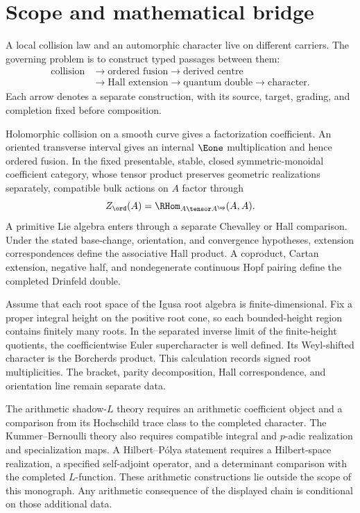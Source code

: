 \chapter*{Scope and mathematical bridge}

A local collision law and an automorphic character live on different
carriers. The governing problem is to construct typed passages between them:
\[
\begin{aligned}
\text{collision}
&\longrightarrow \text{ordered fusion}
 \longrightarrow \text{derived centre}\\
&\longrightarrow \text{Hall extension}
 \longrightarrow \text{quantum double}
 \longrightarrow \text{character}.
\end{aligned}
\]
Each arrow denotes a separate construction, with its source, target, grading,
and completion fixed before composition.

Holomorphic collision on a smooth curve gives a factorization coefficient.
An oriented transverse interval gives an internal $\Eone$ multiplication and
hence ordered fusion. In the fixed presentable, stable, closed
symmetric-monoidal coefficient category, whose tensor product preserves
geometric realizations separately, compatible bulk actions on $A$ factor through
\[
Z_{\ord}(A)=\RHom_{A\tensor A^{\op}}(A,A).
\]
A primitive Lie algebra enters through a separate Chevalley or Hall
comparison. Under the stated base-change, orientation, and convergence
hypotheses, extension correspondences define the associative Hall product.
A coproduct, Cartan extension, negative half, and nondegenerate continuous
Hopf pairing define the completed Drinfeld double.

Assume that each root space of the Igusa root algebra is finite-dimensional.
Fix a proper integral height on the positive root cone, so each bounded-height
region contains finitely many roots. In the separated inverse limit of the
finite-height quotients, the coefficientwise Euler supercharacter is well
defined. Its Weyl-shifted character is the Borcherds product. This calculation
records signed root multiplicities. The bracket, parity decomposition, Hall
correspondence, and orientation line remain separate data.

The arithmetic shadow-$L$ theory requires an arithmetic coefficient object
and a comparison from its Hochschild trace class to the completed character.
The Kummer--Bernoulli theory also requires compatible integral and $p$-adic
realization and specialization maps. A Hilbert--P\'olya statement requires a
Hilbert-space realization, a specified self-adjoint operator, and a
determinant comparison with the completed $L$-function. These arithmetic
constructions lie outside the scope of this monograph. Any arithmetic
consequence of the displayed chain is conditional on those additional data.
